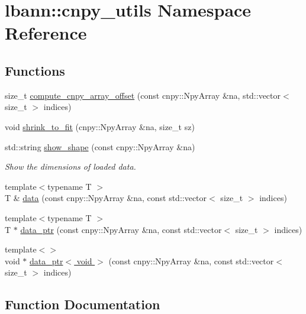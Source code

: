 \hypertarget{namespacelbann_1_1cnpy__utils}{}\section{lbann\+:\+:cnpy\+\_\+utils Namespace Reference}
\label{namespacelbann_1_1cnpy__utils}
\subsection*{Functions}
\begin{DoxyCompactItemize}
\item 
size\+\_\+t \hyperlink{namespacelbann_1_1cnpy__utils_a39fd207d94d1333e6379c53423b6f1a1}{compute\+\_\+cnpy\+\_\+array\+\_\+offset} (const cnpy\+::\+Npy\+Array \&na, std\+::vector$<$ size\+\_\+t $>$ indices)
\item 
void \hyperlink{namespacelbann_1_1cnpy__utils_ab19ad0a361570b7e78e203c02d6ba13a}{shrink\+\_\+to\+\_\+fit} (cnpy\+::\+Npy\+Array \&na, size\+\_\+t sz)
\item 
std\+::string \hyperlink{namespacelbann_1_1cnpy__utils_a120e5719167d6d20b2a98c4282fd7a50}{show\+\_\+shape} (const cnpy\+::\+Npy\+Array \&na)
\begin{DoxyCompactList}\small\item\em Show the dimensions of loaded data. \end{DoxyCompactList}\item 
{\footnotesize template$<$typename T $>$ }\\T \& \hyperlink{namespacelbann_1_1cnpy__utils_a9ac86d96ccb1f8b4b2ea16441738781f}{data} (const cnpy\+::\+Npy\+Array \&na, const std\+::vector$<$ size\+\_\+t $>$ indices)
\item 
{\footnotesize template$<$typename T $>$ }\\T $\ast$ \hyperlink{namespacelbann_1_1cnpy__utils_a348a4aa859715e5859ddd1a5e3a269c9}{data\+\_\+ptr} (const cnpy\+::\+Npy\+Array \&na, const std\+::vector$<$ size\+\_\+t $>$ indices)
\item 
{\footnotesize template$<$$>$ }\\void $\ast$ \hyperlink{namespacelbann_1_1cnpy__utils_aba43b785d14caa5c5df74674f10f0dd8}{data\+\_\+ptr$<$ void $>$} (const cnpy\+::\+Npy\+Array \&na, const std\+::vector$<$ size\+\_\+t $>$ indices)
\end{DoxyCompactItemize}


\subsection{Function Documentation}
\mbox{\label{namespacelbann_1_1cnpy__utils_a39fd207d94d1333e6379c53423b6f1a1}} 
